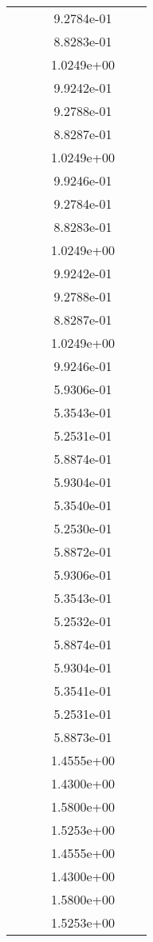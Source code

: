\begin{xltabular}{\textwidth}{r|rS[table-format=1.3e+2]S[table-format=1.4e+2]S[table-format=1.4e+2]S[table-format=-1.5]}
&  &  & 9.2784e-01 & & \\
&  &  & 8.8283e-01 & & \\
&  &  & 1.0249e+00 & & \\
&  &  & 9.9242e-01 & & \\
&  &  & 9.2788e-01 & & \\
&  &  & 8.8287e-01 & & \\
&  &  & 1.0249e+00 & & \\
&  &  & 9.9246e-01 & & \\
&  &  & 9.2784e-01 & & \\
&  &  & 8.8283e-01 & & \\
&  &  & 1.0249e+00 & & \\
&  &  & 9.9242e-01 & & \\
&  &  & 9.2788e-01 & & \\
&  &  & 8.8287e-01 & & \\
&  &  & 1.0249e+00 & & \\
&  &  & 9.9246e-01 & & \\
&  &  & 5.9306e-01 & & \\
&  &  & 5.3543e-01 & & \\
&  &  & 5.2531e-01 & & \\
&  &  & 5.8874e-01 & & \\
&  &  & 5.9304e-01 & & \\
&  &  & 5.3540e-01 & & \\
&  &  & 5.2530e-01 & & \\
&  &  & 5.8872e-01 & & \\
&  &  & 5.9306e-01 & & \\
&  &  & 5.3543e-01 & & \\
&  &  & 5.2532e-01 & & \\
&  &  & 5.8874e-01 & & \\
&  &  & 5.9304e-01 & & \\
&  &  & 5.3541e-01 & & \\
&  &  & 5.2531e-01 & & \\
&  &  & 5.8873e-01 & & \\
&  &  & 1.4555e+00 & & \\
&  &  & 1.4300e+00 & & \\
&  &  & 1.5800e+00 & & \\
&  &  & 1.5253e+00 & & \\
&  &  & 1.4555e+00 & & \\
&  &  & 1.4300e+00 & & \\
&  &  & 1.5800e+00 & & \\
&  &  & 1.5253e+00 & & \\

\end{xltabular}
